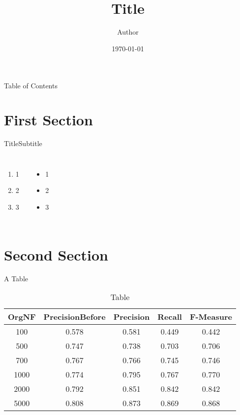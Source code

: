 \documentclass{beamer}
\begin{document}
\title{Title}
\author{Author}
\date{\today}

\begin{frame}
	\titlepage
\end{frame}

\begin{frame}{Table of Contents}
	\tableofcontents
\end{frame}

\section{First Section}
\begin{frame}{Title}{Subtitle}
	\begin{columns}[onlytextwidth]
		\begin{enumerate}
			\item 1
			\item 2
			\item 3
		\end{enumerate}
		\begin{itemize}
			\item 1
			\item 2
			\item 3
		\end{itemize}
	\end{columns}
\end{frame}

\section{Second Section}

\begin{frame}{A Table}
	\begin{table}
		\caption{Table}
		\centering
		\begin{tabular}{ccccc}
			\toprule
			OrgNF & PrecisionBefore & Precision & Recall & F-Measure \\
			\midrule
			100   & 0.578           & 0.581     & 0.449  & 0.442     \\
			500   & 0.747           & 0.738     & 0.703  & 0.706     \\
			700   & 0.767           & 0.766     & 0.745  & 0.746     \\
			1000  & 0.774           & 0.795     & 0.767  & 0.770     \\
			2000  & 0.792           & 0.851     & 0.842  & 0.842     \\
			5000  & 0.808           & 0.873     & 0.869  & 0.868     \\
			\bottomrule
		\end{tabular}
	\end{table}
\end{frame}
\end{document}
